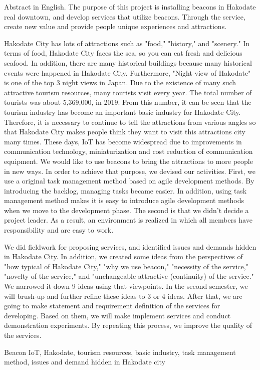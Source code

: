 \begin{eabstract} Abstract in English. 
The purpose of this project is installing beacons in Hakodate real downtown, and develop services that utilize beacons. Through the service, create new value and provide people unique experiences and attractions.

Hakodate City has lots of attractions such as "food," "history," and "scenery."
In terms of food, Hakodate City faces the sea, so you can eat fresh and delicious seafood.
In addition, there are many historical buildings because many historical events were happened in Hakodate City.
Furthermore, "Night view of Hakodate" is one of the top 3 night views in Japan.
Due to the existence of many such attractive tourism resources, many tourists visit every year.
The total number of tourists was about 5,369,000, in 2019.
From this number, it can be seen that the tourism industry has become an important basic industry for Hakodate City.
Therefore, it is necessary to continue to tell the attractions from various angles so that Hakodate City makes people think they want to visit this attractions city many times.
These days, IoT has become widespread due to improvements in communication technology, miniaturization and cost reduction of communication equipment.
We would like to use beacons to bring the attractions to more people in new ways.
In order to achieve that purpose, we devised our activities.
First, we use a original task management method based on agile development methods.
By introducing the backlog, managing tasks became easier.
In addition, using task management method makes it is easy to introduce agile development methods when we move to the development phase.
The second is that we didn't decide a project leader.
As a result, an environment is realized in which all members have responsibility and are easy to work.

We did fieldwork for proposing services, and identified issues and demands hidden in Hakodate City.
In addition, we created some ideas from the perspectives of "how typical of Hakodate City," "why we use beacon," "necessity of the service," "novelty of the service," and "unchangeable attractive (continuity) of the service."
We narrowed it down 9 ideas using that viewpoints.
In the second semester, we will brush-up and further refine these ideas to 3 or 4 ideas.
After that, we are going to make statement and requirement definition of the services for developing.
Based on them, we will make implement services and conduct demonstration experiments.
By repeating this process, we improve the quality of the services. 
\begin{ekeyword}
Beacon IoT, Hakodate, tourism resources, basic industry, task management method, issues and demand hidden in Hakodate city
\end{ekeyword}
\end{eabstract}
